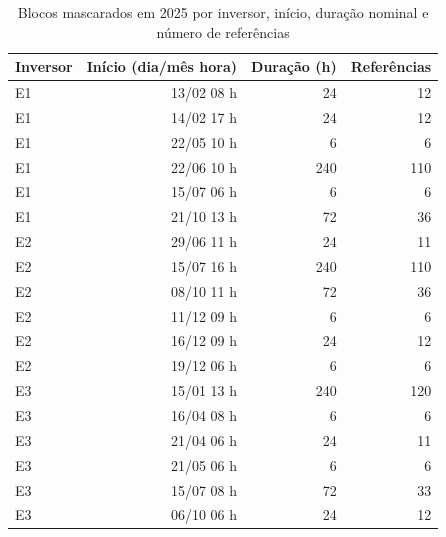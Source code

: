 \begin{table}[htbp]
\centering\small
\caption{Blocos mascarados em 2025 por inversor, início, duração nominal e
número de referências}
\label{tab:blocos-mascara}
\begin{tabular}{lrrr}\toprule
Inversor & Início (dia/mês hora) & Duração (h) & Referências\\\midrule
E1 & 13/02 08 h & 24 & 12\\
E1 & 14/02 17 h & 24 & 12\\
E1 & 22/05 10 h & 6 & 6\\
E1 & 22/06 10 h & 240 & 110\\
E1 & 15/07 06 h & 6 & 6\\
E1 & 21/10 13 h & 72 & 36\\
E2 & 29/06 11 h & 24 & 11\\
E2 & 15/07 16 h & 240 & 110\\
E2 & 08/10 11 h & 72 & 36\\
E2 & 11/12 09 h & 6 & 6\\
E2 & 16/12 09 h & 24 & 12\\
E2 & 19/12 06 h & 6 & 6\\
E3 & 15/01 13 h & 240 & 120\\
E3 & 16/04 08 h & 6 & 6\\
E3 & 21/04 06 h & 24 & 11\\
E3 & 21/05 06 h & 6 & 6\\
E3 & 15/07 08 h & 72 & 33\\
E3 & 06/10 06 h & 24 & 12\\
\bottomrule\end{tabular}
\end{table}
